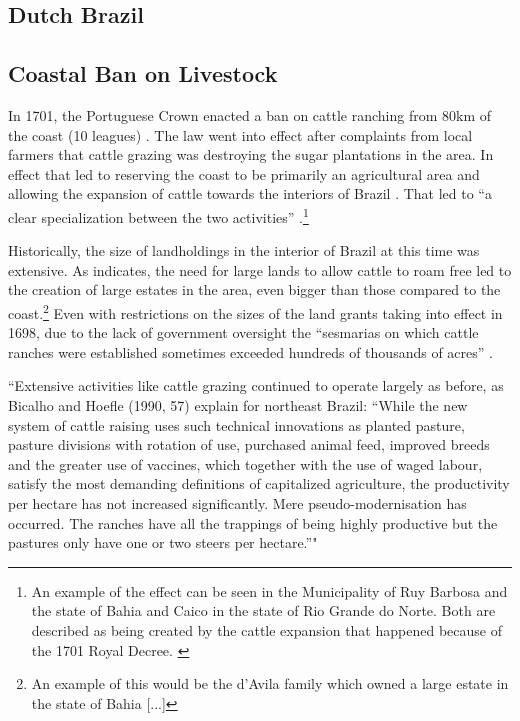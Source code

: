 \documentclass{article}
\begin{document}
\subsection{Dutch Brazil}

\subsection{Coastal Ban on Livestock}

In 1701, the Portuguese Crown enacted a ban on cattle ranching from 80km of the coast (10 leagues) \parencites[p~.40]{Fausto2014-bh}[p~.198]{Simonsen2005-ps}[p~.460]{Bethell1984-of}. 
The law went into effect after complaints from local farmers that cattle grazing was destroying the sugar plantations in the area. 
In effect that led to reserving the coast to be primarily an agricultural area and allowing the expansion of cattle towards the interiors of Brazil \parencite[p.~216]{Junior1967-jv}.
That led to ``a clear specialization between the two activities'' \parencite{Ribeiro2012-lb}.\footnote{An example of the effect can be seen in the Municipality of Ruy Barbosa and the state of Bahia and Caico in the state of Rio Grande do Norte. Both are described as being created by the cattle expansion that happened because of the 1701 Royal Decree. \parencite{UnknownUnknown-ro}}


Historically, the size of landholdings in the interior of Brazil at this time was extensive. 
As \textcite[p~.41]{Fausto2014-bh} indicates, the need for large lands to allow cattle to roam free led to the creation of large estates in the area, even bigger than those compared to the coast.\footnote{An example of this would be the d'Avila family which owned a large estate in the state of Bahia [...]}
Even with restrictions on the sizes of the land grants taking into effect in 1698, due to the lack of government oversight the  ``sesmarias on which cattle ranches were established sometimes exceeded hundreds of thousands of acres'' \parencite{Bethell1984-of}.

\parencite{Carlson2019-mk} ``Extensive  activities  like  
cattle grazing continued to operate largely as before, as Bicalho and Hoefle (1990, 57) explain for northeast  Brazil: “While the new system of cattle raising uses such technical innovations as planted pasture, pasture  divisions with rotation of use, purchased animal feed, improved breeds and the greater use of vaccines, which  together  with  the  use  of  waged  labour,  satisfy  the  most  demanding  definitions  of  capitalized  agriculture,   the productivity per hectare has not increased significantly. Mere pseudo-modernisation has occurred. The  ranches have all the trappings of being highly productive but the pastures only have one or two steers per  hectare.”"
\end{document}
